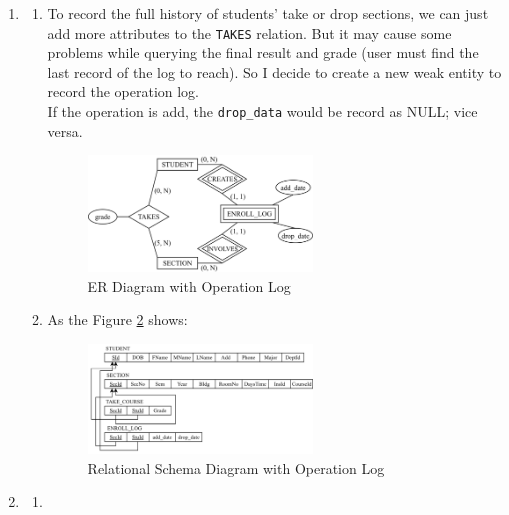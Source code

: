 \documentclass[12pt,a4paper]{article}
\begin{document}
\begin{enumerate}
\begin{enumerate}
    \end{enumerate}
    \item \begin{enumerate}
        \item To record the full history of students' take or drop sections, we can just add more attributes to the \texttt{TAKES} relation. But it may cause some problems while querying the final result and grade (user must find the last record of the log to reach). So I decide to create a new weak entity to record the operation log.\\
        If the operation is add, the \texttt{drop\_data} would be record as NULL; vice versa.\\
        \begin{figure}[H]
            \centering
            \includegraphics[width=0.6\textwidth]{src/2A.png}
            \caption{ER Diagram with Operation Log}
            \label{fig:ER_diagram_with_log}
        \end{figure}
        \item As the Figure \ref{fig:ER_diagram_with_advisor} shows:
        \begin{figure}[H]
            \centering
            \includegraphics[width=0.6\textwidth]{src/2B.png}
            \caption{Relational Schema Diagram with Operation Log}
            \label{fig:ER_diagram_with_advisor}
        \end{figure}
    \end{enumerate}
    \item 
    \begin{enumerate}
        \item
        \begin{verbatim}

\end{verbatim}
\end{enumerate}
\end{enumerate}
\end{document}

